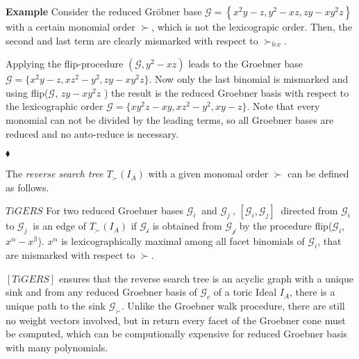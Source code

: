 \textbf{Example}
Consider the reduced Gröbner base $\mathcal{G} = \left\lbrace x^{2}y-z,y^{2}-xz, zy-xy^{2}z \right\rbrace $ 
with a certain monomial order $\succ$, which is not the lexicograpic order.
Then, the second and last term are clearly mismarked with respect to $\succ_{lex}$.

Applying the flip-procedure $(\mathcal{G},y^{2}-xz)$ leads to the Groebner base $\mathcal{G} = \{x^{2}y-z,xz^{2}-y^{2}, zy-xy^{2}z \} $. Now only the last binomial is mismarked and using flip($\mathcal{G}$, $zy-xy^{2}z$ ) the result is the reduced Groebner basis with respect to the lexicographic order $\mathcal{G} = \{xy^{2}z -xy, xz^{2}-y^{2},xy-z \} $. Note that every monomial can not be divided by the leading terms, so all Groebner bases are reduced and no auto-reduce is necessary.
 
\begin{flushright}
$\blacklozenge$
\end{flushright} 

The \textit{reverse search tree} $T_{\succ}(I_{A}) $ with a given monomal order $ \succ $ can be defined as follows.
\begin{env_definition}
$TiGERS  $ For two reduced Groebner bases $ \mathcal{G}_{i}~$ and $ \mathcal{G}_{j}~$, $[\mathcal{G}_{i},\mathcal{G}_{j} ]~$ directed from $\mathcal{G}_{i}~$ to $\mathcal{G}_{j}~$ is an edge of $T_{\succ}(I_{A}) $ if $\mathcal{G_{i}}$ is obtained from $\mathcal{G_{j}}$ by the procedure flip($\mathcal{G}_{i}$,$x^{\upalpha} - x^{\upbeta}$).
$x^{\upalpha}$ is lexicographically maximal among all facet binomials of $\mathcal{G}_{i}$, that are mismarked with respect to $\succ$.
\end{env_definition}

$[TiGERS] $ ensures that the reverse search tree is an acyclic graph with a unique sink and from any reduced Groebner basis of $\mathcal{G}_{c} $ of a toric Ideal $I_{A}$, there is a unique path to the sink $\mathcal{G}_{\succ} $.
Unlike the Groebner walk procedure, there are still no weight vectors involved, but in return every facet of the Groebner cone must be computed, which can be computionally expensive for reduced Groebner basis with many polynomials.


